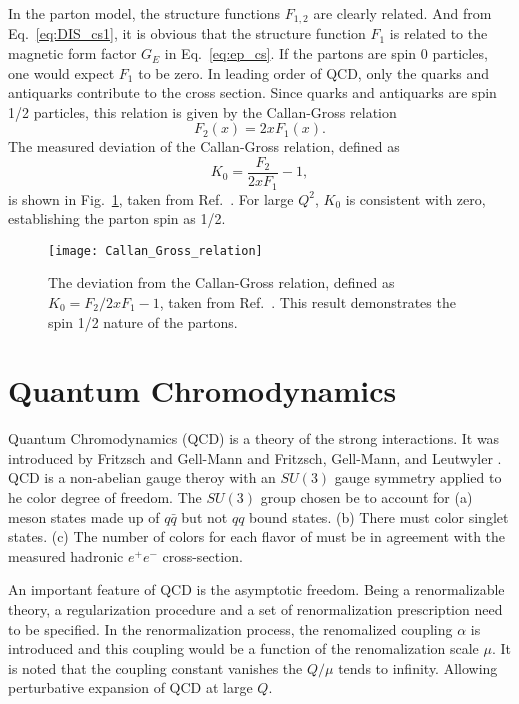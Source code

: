 \documentclass[../main.tex]{subfiles}
\begin{document}
In the parton model, the structure functions $F_{1,2}$ are clearly related. And
from Eq.\ \ref{eq:DIS_cs1}, it is obvious that the structure function $F_1$ is 
related to the magnetic form factor $G_E$ in Eq.\ \ref{eq:ep_cs}. If the partons
are spin 0 particles, one would expect $F_1$ to be zero. In leading order of QCD,
only the quarks and antiquarks contribute to the cross section. Since quarks and 
antiquarks are spin 1/2 particles, this relation is given by the Callan-Gross 
relation\cite{callan1968,callan1969}
\begin{equation}
F_2\left(x\right) = 2x F_1\left(x\right).
\end{equation}
The measured deviation of the Callan-Gross relation, defined as 
\begin{equation}
K_0 = \frac{F_2}{2xF_1}-1,
\end{equation}
is shown in Fig.\ \ref{fig:callan_gross}, taken from Ref.\ \cite{kendall1991}. 
For large $Q^2$, $K_0$ is consistent with zero, establishing the parton spin as
1/2.
\begin{figure}[htbp!]
\centering
\texttt{[image: Callan\_Gross\_relation]}
\caption{The deviation from the Callan-Gross relation, defined as 
	$K_0=F_2/2xF_1 -1$, taken from Ref.\ \cite{kendall1991}. This result
	demonstrates the spin 1/2 nature of the partons.}
\label{fig:callan_gross}
\end{figure}

\section{Quantum Chromodynamics}
\label{sec:QCD}
Quantum Chromodynamics (QCD) is a theory of the strong interactions. It was 
introduced by Fritzsch and Gell-Mann \cite{fritzsch1972} and Fritzsch, Gell-Mann,
and Leutwyler \cite{fritzsch1973}. QCD is a non-abelian gauge theroy with an 
$SU(3)$ gauge symmetry applied to he color degree of freedom. The $SU(3)$ group 
chosen be to account for (a) meson states made up of $q\bar{q}$ but not $qq$ bound states.
(b) There must color singlet states. (c) The number of colors for each flavor of
must be in agreement with the measured hadronic $e^+ e^-$ cross-section.


An important feature of QCD is the asymptotic freedom. Being a renormalizable 
theory, a regularization procedure and a set of renormalization prescription 
need to be specified. In the renormalization process, the renomalized coupling $\alpha$
is introduced and this coupling would be a function of the renomalization scale $\mu$.
It is noted that the coupling constant vanishes the $Q/\mu$ tends to infinity. 
Allowing perturbative expansion of QCD at large $Q$. 
\end{document}
